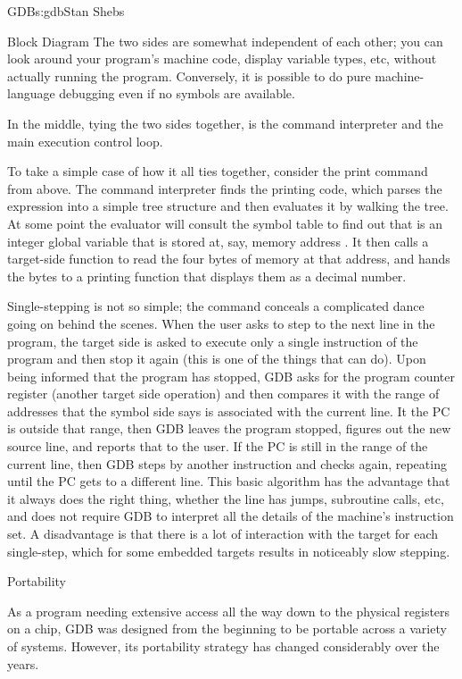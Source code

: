 \begin{aosachapter}{GDB}{s:gdb}{Stan Shebs}
\begin{aosasect1}{Block Diagram}
The two sides are somewhat independent of each other; you can look
around your program's machine code, display variable types, etc,
without actually running the program.  Conversely, it is possible to
do pure machine-language debugging even if no symbols are available.

In the middle, tying the two sides together, is the command
interpreter and the main execution control loop.

To take a simple case of how it all ties together, consider the print
command from above.  The command interpreter finds the printing code,
which parses the expression into a simple tree structure and then
evaluates it by walking the tree.  At some point the evaluator will
consult the symbol table to find out that  is
an integer global variable that is stored at, say, memory address
.  It then calls a target-side function to read the
four bytes of memory at that address, and hands the bytes to a
printing function that displays them as a decimal number.

Single-stepping is not so simple; the command  conceals a
complicated dance going on behind the scenes.  When the user asks to
step to the next line in the program, the target side is asked to
execute only a single instruction of the program and then stop it
again (this is one of the things that  can do).  Upon being
informed that the program has stopped, GDB asks for the program
counter register (another target side operation) and then compares it
with the range of addresses that the symbol side says is associated
with the current line.  It the PC is outside that range, then GDB
leaves the program stopped, figures out the new source line, and
reports that to the user.  If the PC is still in the range of the
current line, then GDB steps by another instruction and checks again,
repeating until the PC gets to a different line.  This basic algorithm
has the advantage that it always does the right thing, whether the
line has jumps, subroutine calls, etc, and does not require GDB to
interpret all the details of the machine's instruction set.  A
disadvantage is that there is a lot of interaction with the target for
each single-step, which for some embedded targets results in
noticeably slow stepping.

\end{aosasect1}

\begin{aosasect1}{Portability}

As a program needing extensive access all the way down to the physical
registers on a chip, GDB was designed from the beginning to be
portable across a variety of systems.  However, its portability
strategy has changed considerably over the years.


\end{aosasect1}
\end{aosachapter}
